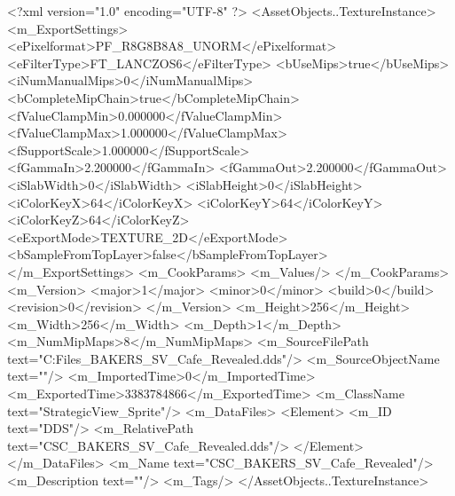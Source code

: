 <?xml version="1.0" encoding="UTF-8" ?>
<AssetObjects..TextureInstance>
	<m_ExportSettings>
		<ePixelformat>PF_R8G8B8A8_UNORM</ePixelformat>
		<eFilterType>FT_LANCZOS6</eFilterType>
		<bUseMips>true</bUseMips>
		<iNumManualMips>0</iNumManualMips>
		<bCompleteMipChain>true</bCompleteMipChain>
		<fValueClampMin>0.000000</fValueClampMin>
		<fValueClampMax>1.000000</fValueClampMax>
		<fSupportScale>1.000000</fSupportScale>
		<fGammaIn>2.200000</fGammaIn>
		<fGammaOut>2.200000</fGammaOut>
		<iSlabWidth>0</iSlabWidth>
		<iSlabHeight>0</iSlabHeight>
		<iColorKeyX>64</iColorKeyX>
		<iColorKeyY>64</iColorKeyY>
		<iColorKeyZ>64</iColorKeyZ>
		<eExportMode>TEXTURE_2D</eExportMode>
		<bSampleFromTopLayer>false</bSampleFromTopLayer>
	</m_ExportSettings>
	<m_CookParams>
		<m_Values/>
	</m_CookParams>
	<m_Version>
		<major>1</major>
		<minor>0</minor>
		<build>0</build>
		<revision>0</revision>
	</m_Version>
	<m_Height>256</m_Height>
	<m_Width>256</m_Width>
	<m_Depth>1</m_Depth>
	<m_NumMipMaps>8</m_NumMipMaps>
	<m_SourceFilePath text="C:\Users\Shadow\Desktop\Working Files\Icons\StrategicView\CSC_BAKERS_SV_Cafe_Revealed.dds"/>
	<m_SourceObjectName text=""/>
	<m_ImportedTime>0</m_ImportedTime>
	<m_ExportedTime>3383784866</m_ExportedTime>
	<m_ClassName text="StrategicView_Sprite"/>
	<m_DataFiles>
		<Element>
			<m_ID text="DDS"/>
			<m_RelativePath text="CSC_BAKERS_SV_Cafe_Revealed.dds"/>
		</Element>
	</m_DataFiles>
	<m_Name text="CSC_BAKERS_SV_Cafe_Revealed"/>
	<m_Description text=""/>
	<m_Tags/>
</AssetObjects..TextureInstance>

